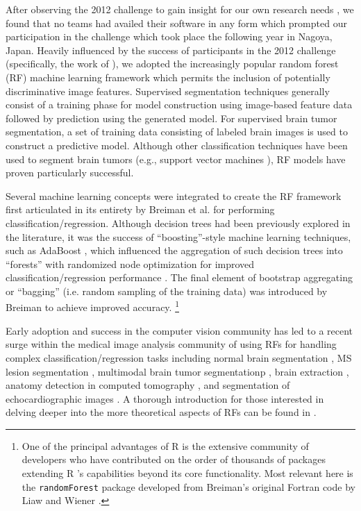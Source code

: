 \documentclass[preprint,authoryear,review,12pt]{elsarticle}
\begin{document}
After observing the 2012 challenge to gain insight for our own research 
needs \citep{durst2014}, we found that no teams had availed their software in any 
form which prompted our participation in the challenge which took place
the following year in Nagoya, Japan.  Heavily influenced by the success 
of participants in the 2012 challenge (specifically, the work of 
\cite{bauer2012,geremia2012,zikic2012}), we adopted the increasingly popular 
random forest (RF) machine learning framework \citep{breiman2001} which 
permits the inclusion of potentially discriminative image features.  
Supervised segmentation techniques generally consist of a training phase
for model construction using image-based feature data followed by prediction using the 
generated model.  For supervised brain tumor segmentation, 
a set of training data consisting of labeled brain images 
is used to construct a predictive model.  Although other 
classification techniques have been used to segment
brain tumors (e.g., support vector machines \citep{bauer2011}),
RF models have proven particularly successful.

Several machine learning concepts were integrated to create 
the RF framework first articulated in its entirety by Breiman
et al. \citep{breiman2001} for performing classification/regression.  
Although decision trees had been previously explored in the literature, 
it was the success of ``boosting''-style machine learning 
techniques, such as AdaBoost \citep{schapire1990,freund1997}, which influenced 
the aggregation of such decision trees into ``forests'' 
with randomized node optimization for improved
classification/regression performance \citep{ho1995,amit1997}.
The final element of bootstrap aggregating or ``bagging'' (i.e.
random sampling of the training data) was
introduced by Breiman \citep{breiman1996} to achieve improved
accuracy.%
\footnote{
One of the principal advantages of R is the extensive community of
developers  who have contributed on the order of thousands of packages 
extending R 's capabilities beyond its core functionality.
Most relevant here
is the {\tt randomForest} package developed from Breiman's original
Fortran code by Liaw and Wiener \citep{liaw2002}.
}

Early adoption \cite{viola2005} and success in the
computer vision community
has led to a recent surge within the medical image analysis
community of using RFs for handling complex 
classification/regression tasks including
normal brain segmentation \citep{yi2009},
MS lesion segmentation \cite{geremia2011}, 
multimodal brain tumor segmentationp
\citep{bauer2012,zikic2012}, brain extraction \citep{iglesias2010}, 
anatomy detection in computed tomography \citep{criminisi2013}, and
segmentation of echocardiographic images \citep{verhoek2011}. 
A thorough introduction for those interested in delving deeper 
into the more theoretical aspects of RFs can be found
in \cite{criminisi2011}.
\end{document}

